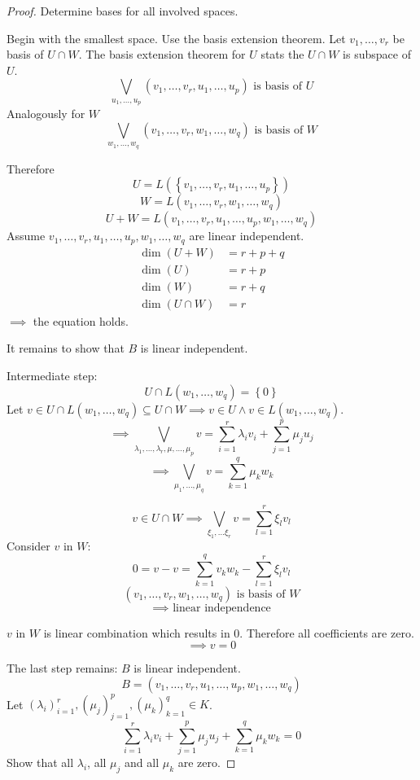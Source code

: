 \documentclass[a4paper,landscape,twocolumn]{article}
\newcommand\set[1]{\left\{#1\right\}}
\begin{document}
\begin{proof}
  Determine bases for all involved spaces.

  Begin with the smallest space. Use the basis extension theorem.
  Let $v_1, \dots, v_r$ be basis of $U \cap W$.
  The basis extension theorem for $U$ stats the $U \cap W$ is subspace of $U$.
  \[ \bigvee_{u_1, \dots, u_p} (v_1, \dots, v_r, u_1, \dots, u_p) \text{ is basis of } U \]
  Analogously for $W$
  \[ \bigvee_{w_1, \dots, w_q} (v_1, \dots, v_r, w_1, \dots, w_q) \text{ is basis of } W \]

  Therefore
  \[ U = L(\set{v_1, \dots, v_r, u_1, \dots, u_p}) \]
  \[ W = L(v_1, \dots, v_r, w_1, \dots, w_q) \]
  \[ U + W = L(v_1, \dots, v_r, u_1, \dots, u_p, w_1, \dots, w_q) \]
  Assume $v_1, \dots, v_r, u_1, \dots, u_p, w_1, \dots, w_q$ are linear independent.
  \begin{align*}
        \dim(U+W) &= r + p + q \\
          \dim(U) &= r+p \\
          \dim(W) &= r+q \\
    \dim(U\cap W) &= r
  \end{align*}
  $\implies$ the equation holds.

  It remains to show that $B$ is linear independent.

  Intermediate step:
  \[ U \cap L(w_1, \dots, w_q) = \set{0} \]
  Let $v \in U \cap L(w_1, \dots, w_q) \subseteq U \cap W \implies v \in U \land v \in L(w_1, \dots, w_q)$.
  \[ \implies \bigvee_{\lambda_1, \dots, \lambda_r, \mu, \dots, \mu_p} v = \sum_{i=1}^r \lambda_i v_i + \sum_{j=1}^p \mu_j u_j \]
  \[ \implies \bigvee_{\mu_1, \dots, \mu_q} v = \sum_{k=1}^q \mu_k w_k \]

  \[ v \in U \cap W \implies \bigvee_{\xi_1, \dots \xi_r} v = \sum_{l=1}^r \xi_l v_l \]
  Consider $v$ in $W$:
  \[ 0 = v - v = \sum_{k=1}^q v_k w_k - \sum_{l=1}^r \xi_l v_l \]
  \[ (v_1, \dots, v_r, w_1, \dots, w_q) \text{ is basis of } W \]
  \[ \implies \text{ linear independence} \]

  $v$ in $W$ is linear combination which results in $0$. Therefore all coefficients are zero.
  \[ \implies v = 0 \]

  The last step remains: $B$ is linear independent.
  \[ B = (v_1, \dots, v_r, u_1, \dots, u_p, w_1, \dots, w_q) \]
  Let $(\lambda_i)^r_{i=1}, (\mu_j)^p_{j=1}, (\mu_k)_{k=1}^q \in K$.
  \[ \sum_{i=1}^r \lambda_i v_i + \sum_{j=1}^p \mu_j u_j + \sum_{k=1}^q \mu_k w_k = 0 \]
  Show that all $\lambda_i$, all $\mu_j$ and all $\mu_k$ are zero.


\end{proof}
\end{document}
